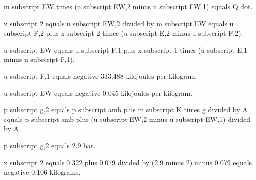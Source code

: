 m subscript EW times (u subscript EW,2 minus u subscript EW,1) equals Q dot.  

x subscript 2 equals u subscript EW,2 divided by m subscript EW equals u subscript F,2 plus x subscript 2 times (u subscript E,2 minus u subscript F,2).  

u subscript EW equals u subscript F,1 plus x subscript 1 times (u subscript E,1 minus u subscript F,1).  

u subscript F,1 equals negative 333.488 kilojoules per kilogram.  

u subscript EW equals negative 0.045 kilojoules per kilogram.  

p subscript g,2 equals p subscript amb plus m subscript K times g divided by A equals p subscript amb plus (u subscript EW,2 minus u subscript EW,1) divided by A.  

p subscript g,2 equals 2.9 bar.  

x subscript 2 equals 0.322 plus 0.079 divided by (2.9 minus 2) minus 0.079 equals negative 0.106 kilograms.
